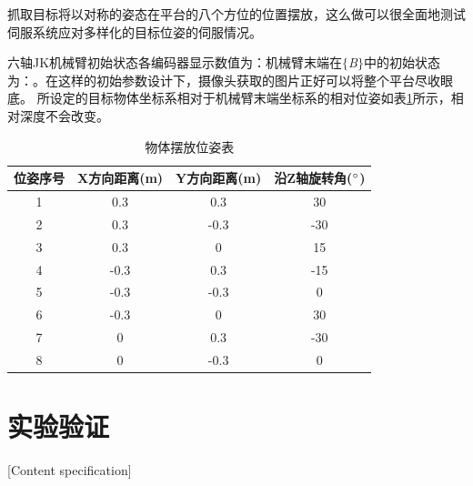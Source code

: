 \documentclass[fontset=fandol,type=bachelor,campus=harbin,bsmainpagenumberline=true]{hithesisbook}
\begin{document}
抓取目标将以对称的姿态在平台的八个方位的位置摆放，这么做可以很全面地测试伺服系统应对多样化的目标位姿的伺服情况。


六轴JK机械臂初始状态各编码器显示数值为：机械臂末端在$\lbrace$\textit{B}$\rbrace$中的初始状态为：。在这样的初始参数设计下，摄像头获取的图片正好可以将整个平台尽收眼底。
所设定的目标物体坐标系相对于机械臂末端坐标系的相对位姿如表\ref{物体摆放位姿表}所示，相对深度不会改变。
\begin{table}[htbp]
\caption{物体摆放位姿表}
\label{物体摆放位姿表}
\vspace{0.5em}\centering\wuhao
\begin{tabular}{cccc}
\toprule[2pt]
位姿序号 & X方向距离(m) & Y方向距离(m) & 沿Z轴旋转角($\degree$)\\
\midrule[1pt]
 1 & 0.3 & 0.3 & 30\\
 2 & 0.3 & -0.3 & -30\\
 3 & 0.3 & 0 & 15\\
 4 & -0.3 & 0.3 & -15\\
 5 & -0.3 & -0.3 & 0\\
 6 & -0.3 & 0 & 30\\
 7 & 0 & 0.3 & -30\\
 8 & 0 & -0.3 & 0\\

\bottomrule[1.5pt]
\end{tabular}
\end{table}





\section{实验验证}[Content specification]
\end{document}
